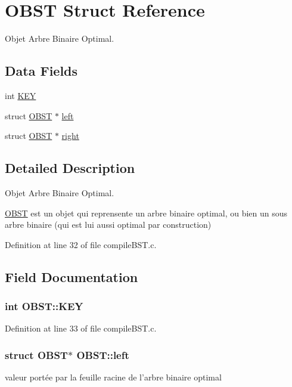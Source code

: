 \hypertarget{structOBST}{\section{O\-B\-S\-T Struct Reference}
\label{structOBST}
}


Objet Arbre Binaire Optimal.  


\subsection*{Data Fields}
\begin{DoxyCompactItemize}
\item 
int \hyperlink{structOBST_a4c9146e94ac8e02c18ceccfb6c6ebddc}{K\-E\-Y}
\item 
struct \hyperlink{structOBST}{O\-B\-S\-T} $\ast$ \hyperlink{structOBST_a2ca8350fa33eecdc29b6f2cf1eb83686}{left}
\item 
struct \hyperlink{structOBST}{O\-B\-S\-T} $\ast$ \hyperlink{structOBST_ab6d8d6c428df9839238a1f666fde3a20}{right}
\end{DoxyCompactItemize}


\subsection{Detailed Description}
Objet Arbre Binaire Optimal. 

\hyperlink{structOBST}{O\-B\-S\-T} est un objet qui reprensente un arbre binaire optimal, ou bien un sous arbre binaire (qui est lui aussi optimal par construction) 

Definition at line 32 of file compile\-B\-S\-T.\-c.



\subsection{Field Documentation}
\hypertarget{structOBST_a4c9146e94ac8e02c18ceccfb6c6ebddc}{
\subsubsection[{K\-E\-Y}]{\setlength{\rightskip}{0pt plus 5cm}int O\-B\-S\-T\-::\-K\-E\-Y}}\label{structOBST_a4c9146e94ac8e02c18ceccfb6c6ebddc}


Definition at line 33 of file compile\-B\-S\-T.\-c.

\hypertarget{structOBST_a2ca8350fa33eecdc29b6f2cf1eb83686}{
\subsubsection[{left}]{\setlength{\rightskip}{0pt plus 5cm}struct {\bf O\-B\-S\-T}$\ast$ O\-B\-S\-T\-::left}}\label{structOBST_a2ca8350fa33eecdc29b6f2cf1eb83686}
valeur portée par la feuille racine de l'arbre binaire optimal 


